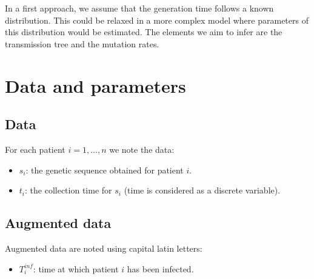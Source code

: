 \documentclass[10pt]{article}
\begin{document}
In a first approach, we assume that the generation time follows a known distribution.
This could be relaxed in a more complex model where parameters of this distribution would be estimated.
The elements we aim to infer are the transmission tree and the mutation rates.




\section*{Data and parameters}

\subsection*{Data}
For each patient $i=1,\ldots,n$ we note the data:
\begin{itemize}
	\item $s_i$: the genetic sequence obtained for patient $i$.
	\item $t_i$: the collection time for $s_i$ (time is considered as a discrete variable).
\end{itemize}



\subsection*{Augmented data}
Augmented data are noted using capital latin letters:
\begin{itemize}
	\item $T_i^{inf}$: time at which patient $i$ has been infected.
\end{itemize}
\end{document}
